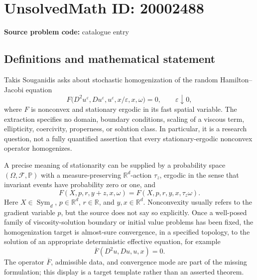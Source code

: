 \documentclass[11pt]{article}
\newcommand{\R}{\mathbb{R}}
\begin{document}
\section*{UnsolvedMath ID: 20002488}
\textbf{Source problem code:} catalogue entry
\subsection{Definitions and mathematical statement}
Takis Souganidis asks about stochastic homogenization of the random Hamilton--Jacobi equation
\[
 F\bigl(D^2u^\varepsilon,Du^\varepsilon,u^\varepsilon,
             x/\varepsilon,x,\omega\bigr)=0,
 \qquad\varepsilon\downarrow0,
\]
where \(F\) is nonconvex and stationary ergodic in its fast spatial variable. The extraction specifies no domain, boundary conditions, scaling of a viscous term, ellipticity, coercivity, properness, or solution class. In particular, it is a research question, not a fully quantified assertion that every stationary-ergodic nonconvex operator homogenizes.

A precise meaning of stationarity can be supplied by a probability space \((\Omega,\mathcal F,\mathbb P)\) with a measure-preserving \(\R^d\)-action \(\tau_z\), ergodic in the sense that invariant events have probability zero or one, and
\[
 F(X,p,r,y+z,x,\omega)=F(X,p,r,y,x,\tau_z\omega).
\]
Here \(X\in\operatorname{Sym}_d\), \(p\in\R^d\), \(r\in\R\), and \(y,x\in\R^d\). Nonconvexity usually refers to the gradient variable \(p\), but the source does not say so explicitly. Once a well-posed family of viscosity-solution boundary or initial value problems has been fixed, the homogenization target is almost-sure convergence, in a specified topology, to the solution of an appropriate deterministic effective equation, for example
\[
 \overline F(D^2u,Du,u,x)=0.
\]
The operator \(\overline F\), admissible data, and convergence mode are part of the missing formulation; this display is a target template rather than an asserted theorem.
\end{document}

